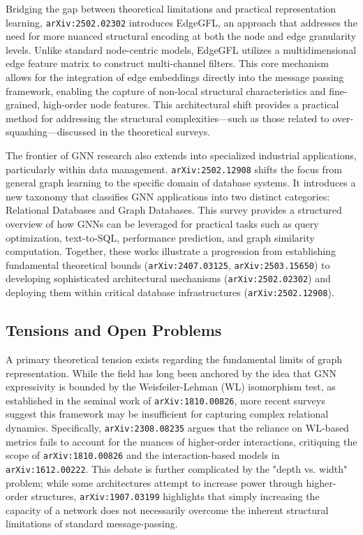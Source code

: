 \documentclass[11pt]{article}
\begin{document}
Bridging the gap between theoretical limitations and practical representation learning, \texttt{arXiv:2502.02302} introduces EdgeGFL, an approach that addresses the need for more nuanced structural encoding at both the node and edge granularity levels. Unlike standard node-centric models, EdgeGFL utilizes a multidimensional edge feature matrix to construct multi-channel filters. This core mechanism allows for the integration of edge embeddings directly into the message passing framework, enabling the capture of non-local structural characteristics and fine-grained, high-order node features. This architectural shift provides a practical method for addressing the structural complexities—such as those related to over-squashing—discussed in the theoretical surveys.

The frontier of GNN research also extends into specialized industrial applications, particularly within data management. \texttt{arXiv:2502.12908} shifts the focus from general graph learning to the specific domain of database systems. It introduces a new taxonomy that classifies GNN applications into two distinct categories: Relational Databases and Graph Databases. This survey provides a structured overview of how GNNs can be leveraged for practical tasks such as query optimization, text-to-SQL, performance prediction, and graph similarity computation. Together, these works illustrate a progression from establishing fundamental theoretical bounds (\texttt{arXiv:2407.03125}, \texttt{arXiv:2503.15650}) to developing sophisticated architectural mechanisms (\texttt{arXiv:2502.02302}) and deploying them within critical database infrastructures (\texttt{arXiv:2502.12908}).

\subsection{Tensions and Open Problems}

A primary theoretical tension exists regarding the fundamental limits of graph representation. While the field has long been anchored by the idea that GNN expressivity is bounded by the Weisfeiler-Lehman (WL) isomorphism test, as established in the seminal work of \texttt{arXiv:1810.00826}, more recent surveys suggest this framework may be insufficient for capturing complex relational dynamics. Specifically, \texttt{arXiv:2308.08235} argues that the reliance on WL-based metrics fails to account for the nuances of higher-order interactions, critiquing the scope of \texttt{arXiv:1810.00826} and the interaction-based models in \texttt{arXiv:1612.00222}. This debate is further complicated by the "depth vs. width" problem; while some architectures attempt to increase power through higher-order structures, \texttt{arXiv:1907.03199} highlights that simply increasing the capacity of a network does not necessarily overcome the inherent structural limitations of standard message-passing.
\end{document}
